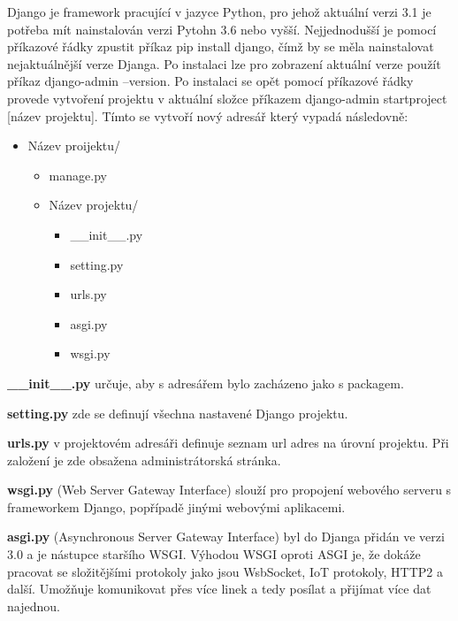 Django je framework pracující v jazyce Python, pro jehož aktuální verzi 3.1 je potřeba mít nainstalován verzi Pytohn 3.6 nebo vyšší. Nejjednodušší je pomocí příkazové řádky zpustit příkaz pip install django, čímž by se měla nainstalovat nejaktuálnější verze Djanga. Po instalaci lze pro zobrazení aktuální verze použít příkaz django-admin --version. Po instalaci se opět pomocí příkazové řádky provede vytvoření projektu v aktuální složce příkazem django-admin startproject [název projektu]. Tímto se vytvoří nový adresář který vypadá následovně:

\begin{itemize}
	\item \lbrack Název proijektu\rbrack /
	\begin{itemize}
		\item manage.py
		\item \lbrack Název projektu\rbrack /
		\begin{itemize}
			\item \_\_init\_\_.py
			\item setting.py
			\item urls.py
			\item asgi.py
			\item wsgi.py
		\end{itemize}
	\end{itemize}
\end{itemize}

\vspace{6px}

\textbf{\_\_init\_\_.py} určuje, aby s adresářem bylo zacházeno jako s packagem.
\vspace{6px}

\textbf{setting.py} zde se definují všechna nastavené Django projektu. 
\vspace{6px}

\textbf{urls.py} v projektovém adresáři definuje seznam url adres na úrovní projektu. Při založení je zde obsažena administrátorská stránka.
\vspace{6px}

\textbf{wsgi.py} (Web Server Gateway Interface) slouží pro propojení webového serveru s frameworkem Django, popřípadě jinými webovými aplikacemi. 
\vspace{6px}

\textbf{asgi.py} (Asynchronous Server Gateway Interface) byl do Djanga přidán ve verzi 3.0 a je nástupce staršího WSGI. Výhodou WSGI oproti ASGI je, že dokáže pracovat se složitějšími protokoly jako jsou WsbSocket, IoT protokoly, HTTP2 a další. Umožňuje komunikovat přes více linek a tedy posílat a přijímat více dat najednou.
\vspace{6px}

